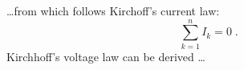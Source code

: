 \documentclass{article}
\begin{document}
\ldots from which follows Kirchoff’s current law:
\begin{equation}
\sum_{k=1}^{n} I_k = 0 \; .
\end{equation}
Kirchhoff’s voltage law can be derived \ldots
\end{document}
